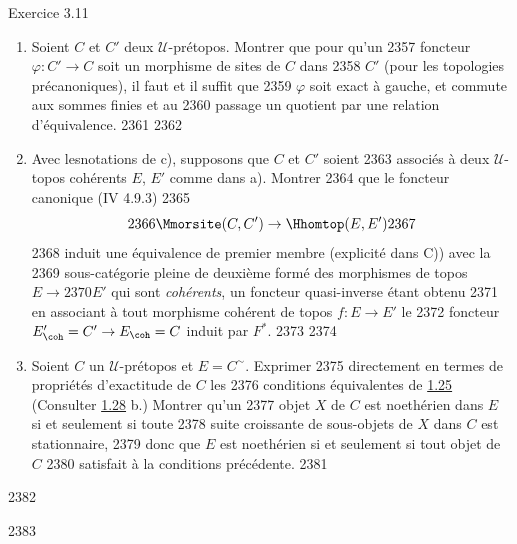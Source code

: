 \begin{enonce*}[remark]{Exercice 3.11}
\begin{enumerate}
  2348	  équivalence de $C$ avec la sous-catégorie $E_{\coh}$ de $E$. (Montrer
  2349	  d'abord que $\varepsilon$ est un foncteur pleinement fidèle exact à
  2350	  gauche commutant aux sommes finies et au passage au quotient par une
  2351	  relation d'équivalence, puis qu'un sous-objet cohérent dans $E$ d'un
  2352	  objet de $C$ est dans l'image essentielle de $C$.) Par suite, le
  2353	  $𝒰$-prétopos $C$ se reconstitue à équivalence de catégories près
  2354	  quand on connaît le $𝒰$-topos associé $E = C^{\sim}$.
  2355	
  2356	\item Soient $C$ et $C'$ deux $𝒰$-prétopos. Montrer que pour qu'un
  2357	  foncteur $\varphi : C'\to C$ soit un morphisme de sites de $C$ dans
  2358	  $C'$ (pour les topologies précanoniques), il faut et il suffit que
  2359	  $\varphi$ soit exact à gauche, et commute aux sommes finies et au
  2360	  passage un quotient par une relation d'équivalence.
  2361	
  2362	\item Avec les\pageoriginale notations de c), supposons que $C$ et $C'$ soient
  2363	  associés à deux $𝒰$-topos cohérents $E$, $E'$ comme dans a). Montrer
  2364	  que le foncteur canonique (IV 4.9.3)
  2365	$$
  2366	\Mmorsite (C, C') \to \Hhomtop(E, E')
  2367	$$
  2368	induit une équivalence de premier membre (explicité dans C)) avec la
  2369	sous-catégorie pleine de deuxième formé des morphismes de topos $E \to
  2370	E'$ qui sont \emph{cohérents}, un foncteur quasi-inverse étant obtenu
  2371	en associant à tout morphisme cohérent de topos $f : E \to E'$ le
  2372	foncteur $E'_{\coh} = C' \to E_{\coh} = C$ induit par $F^{\ast}$.
  2373	
  2374	\item Soient $C$ un $𝒰$-prétopos et $E = C^{\sim}$. Exprimer
  2375	  directement en termes de propriétés d'exactitude de $C$ les
  2376	  conditions équivalentes de \hyperref[VI.cor1.25]{1.25} (Consulter \hyperref[VI.exer1.28]{1.28} b.) Montrer qu'un
  2377	  objet $X$ de $C$ est noethérien dans $E$ si et seulement si toute
  2378	  suite croissante de sous-objets de $X$ dans $C$ est stationnaire,
  2379	  donc que $E$ est noethérien si et seulement si tout objet de $C$
  2380	  satisfait à la conditions précédente.
  2381	\end{enumerate}
  2382	\end{enonce*}
  2383	
